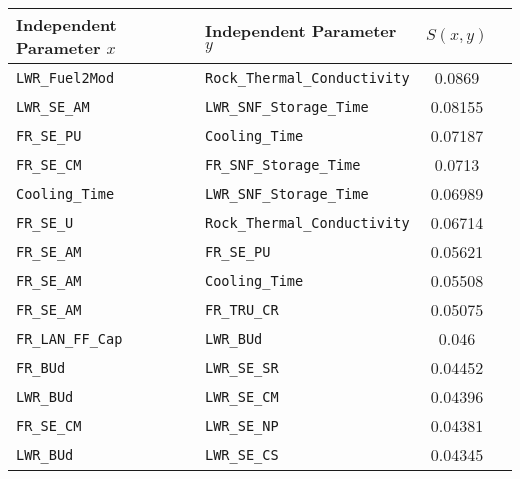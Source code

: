 \begin{center}
\begin{tabular}{|l|l|c|c|}
\hline
\textbf{Independent Parameter $x$}&\textbf{Independent Parameter $y$}&\textbf{$S(x,y)$}\\
\hline
\texttt{LWR\_Fuel2Mod}&\texttt{Rock\_Thermal\_Conductivity}&0.0869\\
\hline
\texttt{LWR\_SE\_AM}&\texttt{LWR\_SNF\_Storage\_Time}&0.08155\\
\hline
\texttt{FR\_SE\_PU}&\texttt{Cooling\_Time}&0.07187\\
\hline
\texttt{FR\_SE\_CM}&\texttt{FR\_SNF\_Storage\_Time}&0.0713\\
\hline
\texttt{Cooling\_Time}&\texttt{LWR\_SNF\_Storage\_Time}&0.06989\\
\hline
\texttt{FR\_SE\_U}&\texttt{Rock\_Thermal\_Conductivity}&0.06714\\
\hline
\texttt{FR\_SE\_AM}&\texttt{FR\_SE\_PU}&0.05621\\
\hline
\texttt{FR\_SE\_AM}&\texttt{Cooling\_Time}&0.05508\\
\hline
\texttt{FR\_SE\_AM}&\texttt{FR\_TRU\_CR}&0.05075\\
\hline
\texttt{FR\_LAN\_FF\_Cap}&\texttt{LWR\_BUd}&0.046\\
\hline
\texttt{FR\_BUd}&\texttt{LWR\_SE\_SR}&0.04452\\
\hline
\texttt{LWR\_BUd}&\texttt{LWR\_SE\_CM}&0.04396\\
\hline
\texttt{FR\_SE\_CM}&\texttt{LWR\_SE\_NP}&0.04381\\
\hline
\texttt{LWR\_BUd}&\texttt{LWR\_SE\_CS}&0.04345\\
\hline
\end{tabular}
\end{center}


\begin{comment}
\texttt{Ambient\_Temp}&\texttt{FR\_SE\_CM}&0.04092\\
\hline
\texttt{FR\_SE\_U}&\texttt{LWR\_BUd}&0.03978\\
\hline
\texttt{LWR\_SE\_SR}&\texttt{Rock\_Thermal\_Conductivity}&0.03934\\
\hline
\texttt{Ambient\_Temp}&\texttt{Rock\_Thermal\_Conductivity}&0.03814\\
\hline
\texttt{FR\_BUd}&\texttt{FR\_SNF\_Storage\_Time}&0.03783\\
\hline
\texttt{Heat\_Loss\_Factor}&\texttt{Cooling\_Time}&0.03696\\
\hline
\texttt{LWR\_BUd}&\texttt{LWR\_SE\_NP}&0.0363\\
\hline
\texttt{LWR\_SNF\_Storage\_Time}&\texttt{Rock\_Thermal\_Conductivity}&0.03601\\
\hline
\end{comment}

